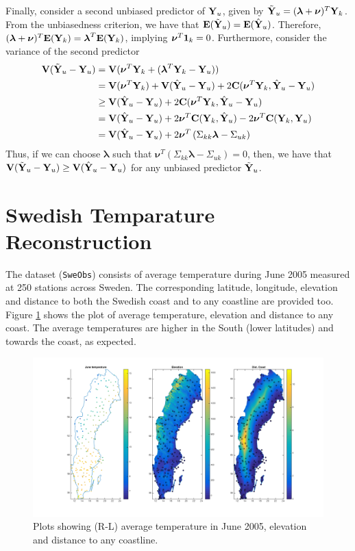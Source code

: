 \documentclass[a4paper,10pt]{article}
\def\bY{{\bf Y}}
\def\bE{{\bf E}}
\def\bV{{\bf V}}
\def\bC{{\bf C}}
\def\b1{{\bf 1}}
\def\blambda{{\boldsymbol \lambda}}
\def\bnu{{\boldsymbol \nu}}
\begin{document}
Finally, consider a second unbiased predictor of $\bY_u$, given by $\tilde \bY_u = (\blambda + \bnu)^T \bY_k$. From the unbiasedness criterion, we have that $\bE(\tilde \bY_u) = \bE(\hat \bY_u)$. Therefore, $(\blambda + \bnu)^T \bE(\bY_k) = \blambda^T \bE(\bY_k)$, implying $\bnu^T \b1_k = 0$. Furthermore, consider the variance of the second predictor
\begin{align*}
 \bV(\tilde \bY_u - \bY_u) &= \bV(\bnu^T \bY_k + (\blambda^T \bY_k - \bY_u))\\
 &= \bV(\bnu^T \bY_k) + \bV(\hat \bY_u - \bY_u) + 2\bC(\bnu^T \bY_k, \hat \bY_u - \bY_u) \\
 &\ge \bV(\hat \bY_u - \bY_u) + 2\bC(\bnu^T \bY_k, \hat \bY_u - \bY_u)\\
 &= \bV(\hat \bY_u - \bY_u) + 2\bnu^T \bC(\bY_k, \hat \bY_u) - 2 \bnu^T \bC(\bY_k, \bY_u) \\
 &= \bV(\hat \bY_u - \bY_u) + 2\bnu^T \left(  \Sigma_{kk} \blambda - \Sigma_{uk}\right)
\end{align*}
Thus, if we can choose $\blambda$ such that $\bnu^T \left(  \Sigma_{kk} \blambda - \Sigma_{uk}\right) = 0$, then, we have that $\bV(\tilde \bY_u - \bY_u) \ge \bV(\hat \bY_u - \bY_u)$ for any unbiased predictor $\tilde \bY_u$.

\section{Swedish Temparature Reconstruction}
The dataset ({\texttt{SweObs}}) consists of average temperature during June 2005 measured at 250 stations across Sweden. The corresponding latitude, longitude, elevation and distance to both the Swedish coast and to any coastline are provided too. Figure \ref{fig:rawdataplot} shows the plot of average temperature, elevation and distance to any coast. The average temperatures are higher in the South (lower latitudes) and towards the coast, as expected.
\begin{figure}[ht]
	\centering
	\includegraphics[width=0.8\linewidth]{raw_data_plot.png}
	\caption{Plots showing (R-L) average temperature in June 2005, elevation and distance to any coastline.}
	\label{fig:rawdataplot}
\end{figure}
\end{document}
